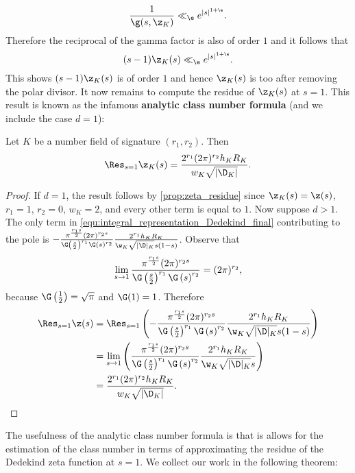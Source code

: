       \[
        \frac{1}{\g(s,\z_{K})} \ll_{\e} e^{|s|^{1+\e}}.
      \]
      Therefore the reciprocal of the gamma factor is also of order $1$ and it follows that
      \[
        (s-1)\z_{K}(s) \ll_{\e} e^{|s|^{1+\e}}.
      \]
      This shows $(s-1)\z_{K}(s)$ is of order $1$ and hence $\z_{K}(s)$ is too after removing the polar divisor. It now remains to compute the residue of $\z_{K}(s)$ at $s = 1$. This result is known as the infamous \textbf{analytic class number formula} (and we include the case $d = 1$):

      \begin{theorem}
        Let $K$ be a number field of signature $(r_{1},r_{2})$. Then
        \[
          \Res_{s = 1}\z_{K}(s) = \frac{2^{r_{1}}(2\pi)^{r_{2}}h_{K}R_{K}}{w_{K}\sqrt{|\D_{K}|}}.
        \]
      \end{theorem}
      \begin{proof}
        If $d = 1$, the result follows by \cref{prop:zeta_residue} since $\z_{K}(s) = \z(s)$, $r_{1} = 1$, $r_{2} = 0$, $w_{K} = 2$, and every other term is equal to $1$. Now suppose $d > 1$. The only term in \cref{equ:integral_representation_Dedekind_final} contributing to the pole is $-\frac{\pi^{\frac{r_{1}s}{2}}(2\pi)^{r_{2}s}}{\G\left(\frac{s}{2}\right)^{r_{1}}\G\left(s\right)^{r_{2}}}\frac{2^{r_{1}}h_{K}R_{K}}{\w_{K}\sqrt{|\D|_{K}}s(1-s)}$. Observe that
        \[
          \lim_{s \to 1}\frac{\pi^{\frac{r_{1}s}{2}}(2\pi)^{r_{2}s}}{\G\left(\frac{s}{2}\right)^{r_{1}}\G\left(s\right)^{r_{2}}} = (2\pi)^{r_{2}},
        \]
        because $\G\left(\frac{1}{2}\right) = \sqrt{\pi}$ and $\G(1) = 1$. Therefore
        \begin{align*}
          \Res_{s = 1}\z(s) &= \Res_{s = 1}\left(-\frac{\pi^{\frac{r_{1}s}{2}}(2\pi)^{r_{2}s}}{\G\left(\frac{s}{2}\right)^{r_{1}}\G\left(s\right)^{r_{2}}}\frac{2^{r_{1}}h_{K}R_{K}}{\w_{K}\sqrt{|\D|_{K}}s(1-s)}\right) \\
          &= \lim_{s \to 1}\left(\frac{\pi^{\frac{r_{1}s}{2}}(2\pi)^{r_{2}s}}{\G\left(\frac{s}{2}\right)^{r_{1}}\G\left(s\right)^{r_{2}}}\frac{2^{r_{1}}h_{K}R_{K}}{\w_{K}\sqrt{|\D|_{K}}s}\right) \\
          &= \frac{2^{r_{1}}(2\pi)^{r_{2}}h_{K}R_{K}}{w_{K}\sqrt{|\D_{K}|}}.
        \end{align*}
      \end{proof}

      The usefulness of the analytic class number formula is that is allows for the estimation of the class number in terms of approximating the residue of the Dedekind zeta function at $s = 1$. We collect our work in the following theorem:

